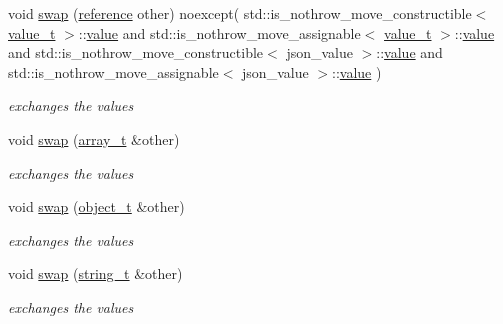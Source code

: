 \begin{DoxyCompactItemize}
void \hyperlink{a00025_af77614992e38b355b9213940051cc582}{swap} (\hyperlink{a00025_a3ec8e17be8732fe436e9d6733f52b7a3}{reference} other) noexcept(                       std\+::is\+\_\+nothrow\+\_\+move\+\_\+constructible$<$ \hyperlink{a00025_a231b02148577b69a154b2ce2c87a5522}{value\+\_\+t} $>$\+::\hyperlink{a00025_a0a2cbbd95862a623e7dc5c37e67dead0}{value} and                       std\+::is\+\_\+nothrow\+\_\+move\+\_\+assignable$<$ \hyperlink{a00025_a231b02148577b69a154b2ce2c87a5522}{value\+\_\+t} $>$\+::\hyperlink{a00025_a0a2cbbd95862a623e7dc5c37e67dead0}{value} and                       std\+::is\+\_\+nothrow\+\_\+move\+\_\+constructible$<$ json\+\_\+value $>$\+::\hyperlink{a00025_a0a2cbbd95862a623e7dc5c37e67dead0}{value} and                       std\+::is\+\_\+nothrow\+\_\+move\+\_\+assignable$<$ json\+\_\+value $>$\+::\hyperlink{a00025_a0a2cbbd95862a623e7dc5c37e67dead0}{value}       )
\begin{DoxyCompactList}\small\item\em exchanges the values \end{DoxyCompactList}\item 
void \hyperlink{a00025_a8209621de6184d9eabe136b7c8f61935}{swap} (\hyperlink{a00025_ab00b882d39306d663c23dab110f5cae0}{array\+\_\+t} \&other)
\begin{DoxyCompactList}\small\item\em exchanges the values \end{DoxyCompactList}\item 
void \hyperlink{a00025_a38ee0f09a318d003add75e0787040794}{swap} (\hyperlink{a00025_a0ac9894c9de8dc551cf2e5f1c605537f}{object\+\_\+t} \&other)
\begin{DoxyCompactList}\small\item\em exchanges the values \end{DoxyCompactList}\item 
void \hyperlink{a00025_a86089c703a2e563b9f760c2f8408efa7}{swap} (\hyperlink{a00025_ab63e618bbb0371042b1bec17f5891f42}{string\+\_\+t} \&other)
\begin{DoxyCompactList}\small\item\em exchanges the values \end{DoxyCompactList}\end{DoxyCompactItemize}
